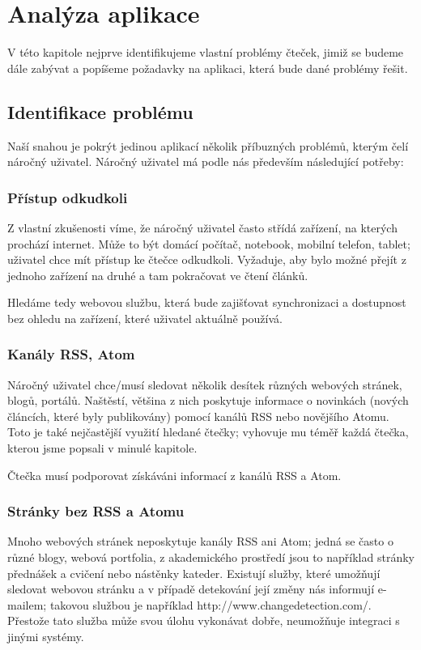 \chapter{Analýza aplikace}

V této kapitole nejprve identifikujeme vlastní problémy čteček, jimiž se budeme dále zabývat a popíšeme požadavky na aplikaci, která bude dané problémy řešit.

\section{Identifikace problému}

Naší snahou je pokrýt jedinou aplikací několik příbuzných problémů, kterým čelí náročný uživatel.
Náročný uživatel má podle nás především následující potřeby:

\subsection{Přístup odkudkoli}
Z vlastní zkušenosti víme, že náročný uživatel často střídá zařízení, na kterých prochází internet.
Může to být domácí počítač, notebook, mobilní telefon, tablet; uživatel chce mít přístup ke čtečce odkudkoli.
Vyžaduje, aby bylo možné přejít z jednoho zařízení na druhé a tam pokračovat ve čtení článků.

Hledáme tedy webovou službu, která bude zajišťovat synchronizaci a dostupnost bez ohledu na zařízení, které uživatel aktuálně používá.

\subsection{Kanály RSS, Atom}
Náročný uživatel chce/musí sledovat několik desítek různých webových stránek, blogů, portálů.
Naštěstí, většina z nich poskytuje informace o novinkách (nových článcích, které byly publikovány) pomocí kanálů RSS nebo novějšího Atomu.
Toto je také nejčastější využití hledané čtečky; vyhovuje mu téměř každá čtečka, kterou jsme popsali v minulé kapitole. %

Čtečka musí podporovat získáváni informací z kanálů RSS a Atom.

\subsection{Stránky bez RSS a Atomu}
Mnoho webových stránek neposkytuje kanály RSS ani Atom; jedná se často o různé blogy, webová portfolia, z akademického prostředí jsou to například stránky přednášek a cvičení nebo nástěnky kateder.
Existují služby, které umožňují sledovat webovou stránku a v případě detekování její změny nás informují e-mailem; takovou službou je například http://www.changedetection.com/.
Přestože tato služba může svou úlohu vykonávat dobře, neumožňuje integraci s jinými systémy.

